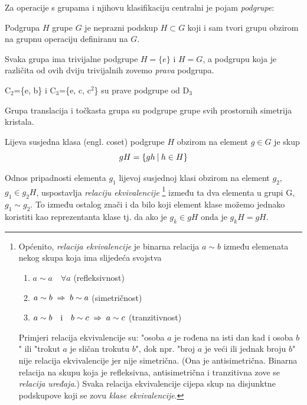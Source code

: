 Za operacije s grupama i njihovu klasifikaciju centralni je pojam \emph{podgrupe}:

\begin{definicija}[Podgrupa]
Podgrupa $H$ grupe $G$ je neprazni podskup $H\subset G$ koji i sam
tvori grupu obzirom na grupnu operaciju definiranu na $G$.
\end{definicija}

Svaka grupa ima trivijalne podgrupe $H=\{e\}$ i $H=G$, a
podgrupu koja je različita od ovih dviju trivijalnih
zovemo \emph{prava} podgrupa.

\begin{primjer} \label{th:c2c3}
C$_2$=\{e, b\} i C$_3$=\{e, c, c$^2$\} su prave podgrupe od D$_3$
\end{primjer}

\begin{primjer}
Grupa translacija i točkasta grupa su podgrupe grupe svih prostornih
simetrija kristala.
\end{primjer}

\begin{definicija}
Lijeva susjedna klasa (engl. coset) podgrupe $H$ obzirom na element
$g\in G$ je skup
\begin{displaymath}
     gH=\{gh \: | \: h\in H\}
\end{displaymath}
\end{definicija}

Odnos pripadnosti elementa $g_1$ lijevoj susjednoj klasi obzirom na element $g_2$,  
$g_1 \in g_2 H$, uspostavlja \emph{relaciju ekvivalencije}%
\footnote{Općenito, \emph{relacija ekvivalencije} je binarna relacija $a\sim b$ između
elemenata nekog
skupa koja ima slijedeća svojstva
\begin{enumerate}
\item $a\sim a \quad \forall a$ \qquad (refleksivnost)
\item $a\sim b \;\Rightarrow\; b\sim a$   \qquad (simetričnost)
\item $a\sim b \quad \textrm{i}\quad  b\sim c \;\Rightarrow\; a\sim c$  \qquad (tranzitivnost)
\end{enumerate}
Primjeri relacija ekvivalencije su: "osoba $a$ je rođena na isti dan kad i osoba $b$"
ili "trokut $a$ je sličan trokutu $b$", dok npr. "broj $a$ je veći ili jednak
broju $b$" nije relacija ekvivalencije jer nije simetrična.
(Ona je antisimetrična. Binarna relacija na skupu koja je refleksivna, antisimetrična
i tranzitivna zove se \emph{relacija uređaja}.)
Svaka relacija ekvivalencije cijepa skup na disjunktne podskupove 
koji se zovu \emph{klase ekvivalencije}.} između ta dva elementa u grupi G, $g_1 \sim g_2$.
To između ostalog znači i da bilo koji element klase možemo jednako koristiti
kao reprezentanta klase tj. da ako je $g_k \in gH$ onda je $g_{k}H = gH$.

